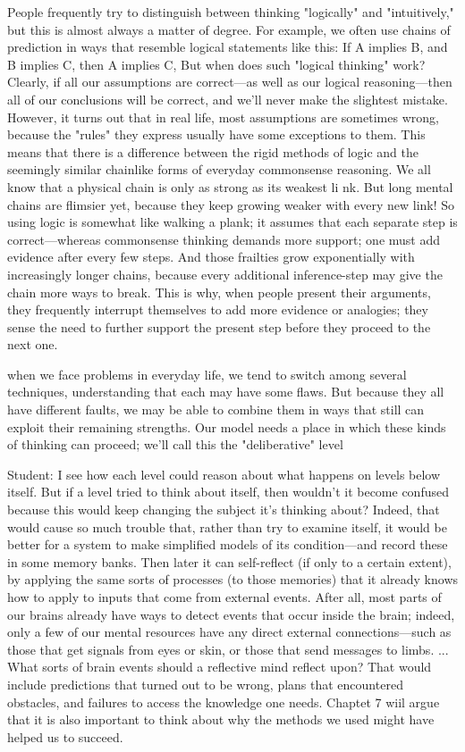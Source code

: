 \documentclass[10pt,a4paper]{article}
\begin{document}
People frequently try to distinguish between thinking "logically" and "intuitively," but this is almost always a matter of degree. For example, we often use chains of prediction in ways that resemble logical statements like this:
If A implies B, and B implies C, then A implies C,
But when does such "logical thinking" work? Clearly, if all our assumptions are correct—as well as our logical reasoning—then all of our conclusions will be correct, and we'll never make the slightest mistake. However, it turns out that in real life, most assumptions are sometimes wrong, because the "rules" they express usually have some exceptions to them. This means that there is a difference between the rigid methods of logic and the seemingly similar chainlike forms of everyday commonsense reasoning. We all know that a physical chain is only as strong as its weakest li nk. But long mental chains are flimsier yet, because they keep growing weaker with every new link! So using logic is somewhat like walking a plank; it assumes that each separate step is correct—whereas commonsense thinking demands more support; one must add evidence after every few steps. And those frailties grow exponentially with increasingly longer chains, because every additional inference-step may give the chain more ways to break. This is why, when people present their arguments, they frequently interrupt themselves to add more evidence or analogies; they sense the need to further support the present step before they proceed to the next one.\cite[p.~140]{minsky}

when we face problems in everyday life, we tend to switch among several techniques, understanding that each may have some flaws. But because they all have different faults, we may be able to combine them in ways that still can exploit their remaining strengths. Our model needs a place in which these kinds of thinking can proceed; we'll call this the "deliberative" level \cite[p.~141]{minsky}

Student: I see how each level could reason about what happens on
levels below itself. But if a level tried to think about itself, then wouldn't it become confused because this would keep changing the subject it's thinking about?
Indeed, that would cause so much trouble that, rather than try to examine itself, it would be better for a system to make simplified models of its condition—and record these in some memory banks. Then later it can self-reflect (if only to a certain extent), by applying the same sorts of processes (to those memories) that it already knows how to apply to inputs that come from external events. After all, most parts of our brains already have ways to detect events that occur inside the brain; indeed, only a few of our mental resources have any direct external connections—such as those that get signals from eyes or skin, or those that send messages to limbs.
...
What sorts of brain events should a reflective mind reflect upon? That would include predictions that turned out to be wrong, plans that encountered obstacles, and failures to access the knowledge one needs. Chaptet 7 wiil argue that it is also important to think about why the methods we used might have helped us to succeed.\cite[p.~142-143]{minsky}
\end{document}
